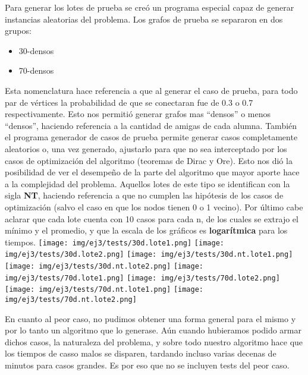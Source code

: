 Para generar los lotes de prueba se creó un programa especial capaz de generar instancias aleatorias del problema. Los grafos de prueba se separaron en dos grupos:
\begin{itemize}
 \item 30-densos
 \item 70-densos
\end{itemize}
Esta nomenclatura hace referencia a que al generar el caso de prueba, para todo par de vértices la probabilidad de que se conectaran fue de 0.3 o 0.7 respectivamente. Esto nos permitió 
generar grafos mas ``densos'' o menos ``densos'', haciendo referencia a la cantidad de amigas de cada alumna. También el programa generador de casos de prueba permite generar casos completamente aleatorios 
o, una vez generado, ajustarlo para que no sea interceptado por los casos de optimización del algoritmo (teoremas de Dirac y Ore). Esto nos dió la posibilidad de ver el desempeño de la parte del 
algoritmo que mayor aporte hace a la complejidad del problema. Aquellos lotes de este tipo se identifican con la sigla \textbf{NT}, haciendo referencia a que no cumplen las hipótesis de los 
casos de optimización (salvo el caso en que los nodos tienen 0 o 1 vecino).
Por último cabe aclarar que cada lote cuenta con 10 casos para cada n, de los cuales se extrajo el mínimo y el promedio, y que la escala de los gráficos es \textbf{logarítmica} para los tiempos.
\newline
\texttt{[image: img/ej3/tests/30d.lote1.png]}
\newline
\texttt{[image: img/ej3/tests/30d.lote2.png]}
\newline
\texttt{[image: img/ej3/tests/30d.nt.lote1.png]}
\newline
\texttt{[image: img/ej3/tests/30d.nt.lote2.png]}
\newline
\texttt{[image: img/ej3/tests/70d.lote1.png]}
\newline
\texttt{[image: img/ej3/tests/70d.lote2.png]}
\newline
\texttt{[image: img/ej3/tests/70d.nt.lote1.png]}
\newline
\texttt{[image: img/ej3/tests/70d.nt.lote2.png]}
\newline

En cuanto al peor caso, no pudimos obtener una forma general para el mismo y por lo tanto un algoritmo que lo generase. Aún cuando hubieramos podido armar dichos casos, la naturaleza 
del problema, y sobre todo nuestro algoritmo hace que los tiempos de casso malos se disparen, tardando incluso varias decenas de minutos para casos grandes. Es por eso que no se incluyen tests 
del peor caso.